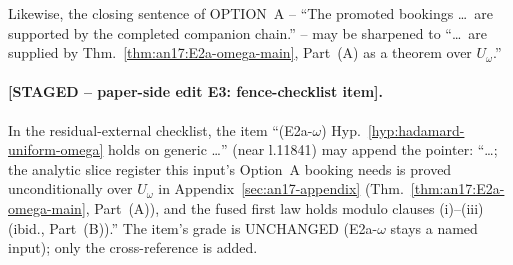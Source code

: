 \noindent Likewise, the closing sentence of OPTION~A -- ``The promoted
bookings \dots\ are supported by the completed companion chain.'' -- may
be sharpened to ``\dots\ are supplied by
Thm.~\ref{thm:an17:E2a-omega-main}, Part~(A) as a theorem over
$U_\omega$.''

\paragraph*{[STAGED -- paper-side edit E3: fence-checklist item].}  In
the residual-external checklist, the item ``(E2a-$\omega$)
Hyp.~\ref{hyp:hadamard-uniform-omega} holds on generic \dots'' (near
l.11841) may append the pointer:
``\dots; the analytic slice register this input's Option~A booking needs
is proved unconditionally over $U_\omega$ in
Appendix~\ref{sec:an17-appendix}
(Thm.~\ref{thm:an17:E2a-omega-main}, Part~(A)), and the fused first law
holds modulo clauses (i)--(iii)
(ibid., Part~(B)).''  The item's grade is UNCHANGED (E2a-$\omega$ stays a
named input); only the cross-reference is added.
\fi

%
%





